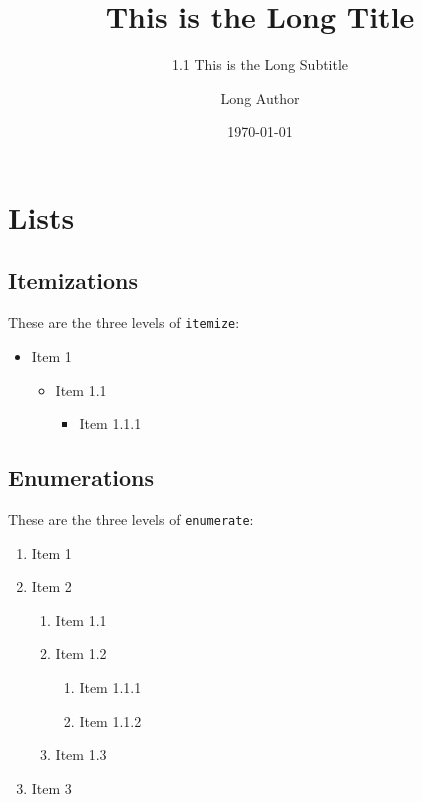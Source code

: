 \documentclass[aspectratio=169]{beamer} %
\title[Short Title]{This is the Long Title}
\subtitle[1.1 Short Subtitle]{1.1 This is the Long Subtitle}
\author[Short Author]{Long Author}
\date{\today}
\begin{document}
    
    \maketitle[IMG_0930][250]

    \section{Lists}

    \subsection{Itemizations}

    \begin{frame}{\insertsubsection}
        These are the three levels of \texttt{itemize}:
        \begin{itemize}
            \item Item 1
            \begin{itemize}
                \item Item 1.1
                \begin{itemize}
                    \item Item 1.1.1
                \end{itemize}
            \end{itemize}
        \end{itemize}
    \end{frame}

    \subsection{Enumerations}

    \begin{frame}{\insertsubsection}
        These are the three levels of \texttt{enumerate}:
        \begin{enumerate}
            \item Item 1
            \item Item 2
            \begin{enumerate}
                \item Item 1.1
                \item Item 1.2
                \begin{enumerate}
                    \item Item 1.1.1
                    \item Item 1.1.2
                \end{enumerate}
                \item Item 1.3
            \end{enumerate}
            \item Item 3
        \end{enumerate}
    \end{frame}
\end{document}
